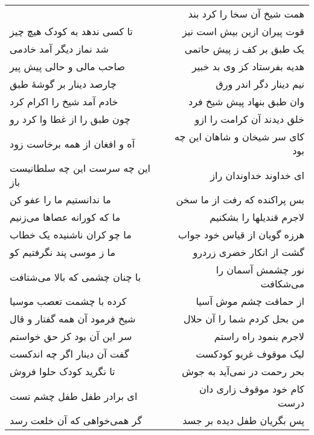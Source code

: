 \begin{center}
\begin{longtable}{l p{0.5cm} r}
&&
همت شیخ آن سخا را کرد بند
\\
تا کسی ندهد به کودک هیچ چیز
&&
قوت پیران ازین بیش است نیز
\\
شد نماز دیگر آمد خادمی
&&
یک طبق بر کف ز پیش حاتمی
\\
صاحب مالی و حالی پیش پیر
&&
هدیه بفرستاد کز وی بد خبیر
\\
چارصد دینار بر گوشهٔ طبق
&&
نیم دینار دگر اندر ورق
\\
خادم آمد شیخ را اکرام کرد
&&
وان طبق بنهاد پیش شیخ فرد
\\
چون طبق را از غطا وا کرد رو
&&
خلق دیدند آن کرامت را ازو
\\
آه و افغان از همه برخاست زود
&&
کای سر شیخان و شاهان این چه بود
\\
این چه سرست این چه سلطانیست باز
&&
ای خداوند خداوندان راز
\\
ما ندانستیم ما را عفو کن
&&
بس پراکنده که رفت از ما سخن
\\
ما که کورانه عصاها می‌زنیم
&&
لاجرم قندیلها را بشکنیم
\\
ما چو کران ناشنیده یک خطاب
&&
هرزه گویان از قیاس خود جواب
\\
ما ز موسی پند نگرفتیم کو
&&
گشت از انکار خضری زردرو
\\
با چنان چشمی که بالا می‌شتافت
&&
نور چشمش آسمان را می‌شکافت
\\
کرده با چشمت تعصب موسیا
&&
از حماقت چشم موش آسیا
\\
شیخ فرمود آن همه گفتار و قال
&&
من بحل کردم شما را آن حلال
\\
سر این آن بود کز حق خواستم
&&
لاجرم بنمود راه راستم
\\
گفت آن دینار اگر چه اندکست
&&
لیک موقوف غریو کودکست
\\
تا نگرید کودک حلوا فروش
&&
بحر رحمت در نمی‌آید به جوش
\\
ای برادر طفل طفل چشم تست
&&
کام خود موقوف زاری دان درست
\\
گر همی‌خواهی که آن خلعت رسد
&&
پس بگریان طفل دیده بر جسد
\\
\end{longtable}
\end{center}
